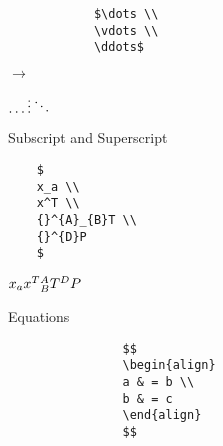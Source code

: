 \documentclass[12pt]{article}
\begin{document}
\begin{multicols}{3}
\begin{latexBox}
\begin{minipage}{5cm}
	\begin{commandBox}
		\begin{verbatim}
			$\dots \\
			\vdots \\ 
			\ddots$
		\end{verbatim}
	\end{commandBox}
\end{minipage}
$\rightarrow$
\begin{minipage}{1cm}
$\dots \\
\vdots \\ 
\ddots$
\end{minipage}
\end{latexBox}








\begin{latexBox}
	{Subscript and Superscript}
	\begin{minipage}{5cm}
		\begin{commandBox}
			\begin{verbatim}
	$
	x_a \\
	x^T \\
	{}^{A}_{B}T \\
	{}^{D}P
	$ 
			\end{verbatim}
		\end{commandBox}
	\end{minipage}
		\begin{minipage}{1cm}
	$
	x_a \\
	x^T \\
	{}^{A}_{B}T \\
	{}^{D}P
	$ 
		\end{minipage}
\end{latexBox}


\begin{latexBox}
	{Equations}
	\begin{minipage}{5cm}
		\begin{commandBox}
			\begin{verbatim}
				$$
				\begin{align}
				a & = b \\
				b & = c
				\end{align}
				$$
			\end{verbatim}
		\end{commandBox}
	\end{minipage}
	\begin{minipage}{1cm}
		

\end{minipage}
\end{latexBox}
\end{multicols}
\end{document}
